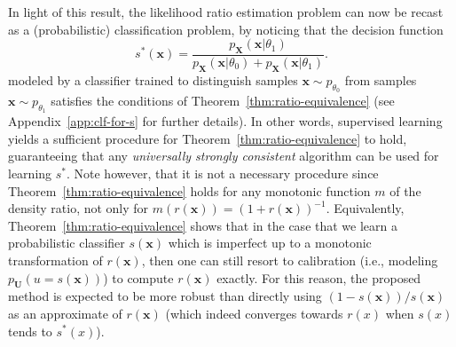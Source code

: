 \documentclass[12pt]{article}
\numberwithin{equation}{section}
\theoremstyle{plain}
\begin{document}

In light of this result, the likelihood ratio estimation problem can now
be recast as a (probabilistic) classification problem, by noticing that the decision
function
\begin{equation}\label{eqn:best-s-clf}
s^*(\mathbf{x}) = \frac{p_{\mathbf{X}}(\mathbf{x}|\theta_1)}{p_{\mathbf{X}}(\mathbf{x} | \theta_0) + p_{\mathbf{X}}(\mathbf{x} | \theta_1)}.
\end{equation}
modeled by a classifier trained to distinguish samples $\mathbf{x} \sim p_{\theta_0}$
from samples $\mathbf{x} \sim p_{\theta_1}$ satisfies the conditions of
Theorem~\ref{thm:ratio-equivalence} (see Appendix~\ref{app:clf-for-s} for further details).
In other words, supervised learning yields a sufficient
procedure for Theorem~\ref{thm:ratio-equivalence} to hold, guaranteeing that any
{\it universally strongly consistent} algorithm can be used for learning $s^*$.
Note however, that it is not a necessary procedure since
Theorem~\ref{thm:ratio-equivalence} holds for any monotonic function $m$ of the
density ratio,  not only for $m(r(\mathbf{x})) = (1 +
r(\mathbf{x}))^{-1}$.
Equivalently,
Theorem~\ref{thm:ratio-equivalence} shows that in the case that we learn a probabilistic
classifier $s(\mathbf{x})$ which is imperfect up to a monotonic transformation
of $r(\mathbf{x})$, then one can still resort to calibration (i.e., modeling
$p_{\mathbf{U}}(u=s(\mathbf{x}))$) to compute $r(\mathbf{x})$ exactly.
For this reason, the proposed method is expected to be more robust than
directly using ${(1 - s(\mathbf{x}))}/{s(\mathbf{x})}$ as an approximate of
$r(\mathbf{x})$ (which indeed converges towards $r(x)$ when $s(x)$ tends to $s^*(x)$).
\end{document}
